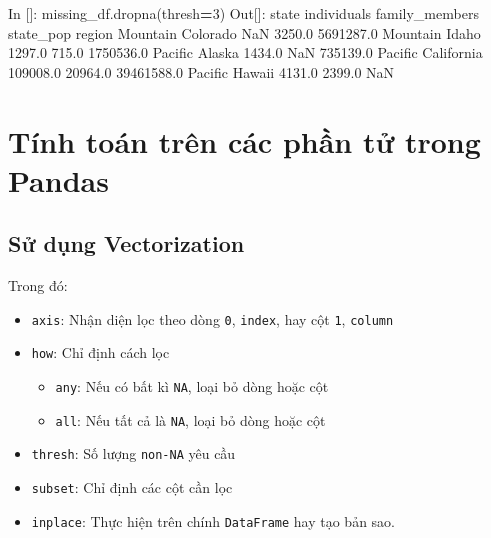 \documentclass[
]{book}
\newenvironment{Shaded}{\begin{snugshade}}{\end{snugshade}}
\newcommand{\DecValTok}[1]{\textcolor[rgb]{0.00,0.00,0.81}{#1}}
\newcommand{\FloatTok}[1]{\textcolor[rgb]{0.00,0.00,0.81}{#1}}
\newcommand{\NormalTok}[1]{#1}
\newcommand{\OperatorTok}[1]{\textcolor[rgb]{0.81,0.36,0.00}{\textbf{#1}}}
\providecommand{\tightlist}{%
  \setlength{\itemsep}{0pt}\setlength{\parskip}{0pt}}
\begin{document}
\begin{Shaded}
\begin{Highlighting}[]
\NormalTok{In []: missing\_df.dropna(thresh}\OperatorTok{=}\DecValTok{3}\NormalTok{)}
\NormalTok{Out[]: }
\NormalTok{               state  individuals  family\_members   state\_pop}
\NormalTok{region                                                       }
\NormalTok{Mountain    Colorado          NaN          }\FloatTok{3250.0}   \FloatTok{5691287.0}
\NormalTok{Mountain       Idaho       }\FloatTok{1297.0}           \FloatTok{715.0}   \FloatTok{1750536.0}
\NormalTok{Pacific       Alaska       }\FloatTok{1434.0}\NormalTok{             NaN    }\FloatTok{735139.0}
\NormalTok{Pacific   California     }\FloatTok{109008.0}         \FloatTok{20964.0}  \FloatTok{39461588.0}
\NormalTok{Pacific       Hawaii       }\FloatTok{4131.0}          \FloatTok{2399.0}\NormalTok{         NaN}
\end{Highlighting}
\end{Shaded}

\hypertarget{tuxednh-touxe1n-truxean-cuxe1c-phux1ea7n-tux1eed-trong-pandas}{%
\chapter{Tính toán trên các phần tử trong Pandas}\label{tuxednh-touxe1n-truxean-cuxe1c-phux1ea7n-tux1eed-trong-pandas}}

\hypertarget{sux1eed-dux1ee5ng-vectorization}{%
\section{Sử dụng Vectorization}\label{sux1eed-dux1ee5ng-vectorization}}

Trong đó:

\begin{itemize}
\item
  \texttt{axis}: Nhận diện lọc theo dòng \texttt{0}, \texttt{index}, hay cột \texttt{1}, \texttt{column}
\item
  \texttt{how}: Chỉ định cách lọc

  \begin{itemize}
  \tightlist
  \item
    \texttt{any}: Nếu có bất kì \texttt{NA}, loại bỏ dòng hoặc cột
  \item
    \texttt{all}: Nếu tất cả là \texttt{NA}, loại bỏ dòng hoặc cột
  \end{itemize}
\item
  \texttt{thresh}: Số lượng \texttt{non-NA} yêu cầu
\item
  \texttt{subset}: Chỉ định các cột cần lọc
\item
  \texttt{inplace}: Thực hiện trên chính \texttt{DataFrame} hay tạo bản sao.
\end{itemize}
\end{document}
